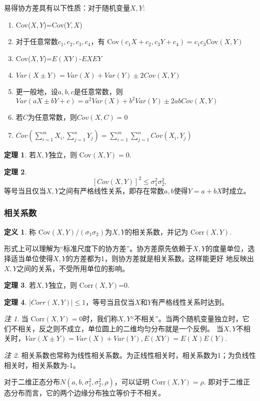 \documentclass[a4paper,11pt]{article}%
\theoremstyle{remark}
\newtheorem*{remark}{注}
\theoremstyle{remark}
\theoremstyle{definition}
\newtheorem{theorem}{定理}[section]
\theoremstyle{definition}
\newtheorem*{definition}{定义}
\theoremstyle{plain}
\newcommand*{\abs}[1]{\lvert #1 \rvert}
\begin{document}
易得协方差具有以下性质：对于随机变量$X,Y$:
\begin{enumerate}
    \item Cov($X,Y$)=Cov($Y,X$)
    \item 对于任意常数$c_1,c_2,c_3,c_4$，有 Cov$(c_1X+c_2,c_3Y+c_4)=c_1c_3$Cov$(X,Y)$
    \item Cov($X,Y$)=$E(XY)$-$EXEY$
    \item$Var(X\pm Y)=Var(X)+Var(Y)\pm 2Cov(X,Y)$
    \item 更一般地，设$a,b,c$是任意常数，则$Var(aX\pm bY+c)=a^2Var(X)+b^2Var(Y)\pm 2abCov(X,Y)$
    \item 若$C$为任意常数，则$Cov(X,C)=0$
    \item$Cov(\sum_{i=1}^{m}X_i,\sum_{j=1}^{n}Y_j)=\sum_{i=1}^{m}\sum_{j=1}^{n}Cov(X_i,Y_j)$
\end{enumerate}
\begin{theorem}
    若$X,Y$独立，则 Cov$(X,Y)=0$.
\end{theorem}
\begin{theorem}
    \[[Cov(X,Y)]^2\leq\sigma_1^2\sigma_2^2,\]
    等号当且仅当$X,Y$之间有严格线性关系，即存在常数$a,b$使得$Y=a+bX$时成立。
\end{theorem}
\subsubsection{相关系数}
\begin{definition}
    称 Cov$(X,Y)/(\sigma_1\sigma_2)$为$X,Y$的相关系数，并记为 Corr$(X,Y)$.
\end{definition}
形式上可以理解为“标准尺度下的协方差”。协方差原先依赖于$X,Y$的度量单位，选择适当单位使得$X,Y$的方差都为1，则协方差就是相关系数。这样能更好
地反映出$X,Y$之间的关系，不受所用单位的影响。
\begin{theorem}
    若$X,Y$独立，则 Corr$(X,Y)$=0.
\end{theorem}
\begin{theorem}$\abs{Corr(X,Y)}\leq 1$，等号当且仅当$X$和$Y$有严格线性关系时达到。
\end{theorem}
\begin{remark}
    当 Corr$(X,Y)=0$时，我们称$X,Y$“不相关”。当两个随机变量独立时，它们不相关，反之则不成立，单位圆上的二维均匀分布就是一个反例。
    当$X,Y$不相关时，$Var(X\pm Y)=Var(X)+Var(Y),E(XY)=E(X)E(Y).$
\end{remark}
\begin{remark}
    相关系数也常称为线性相关系数。为正线性相关时，相关系数为1；为负线性相关时，相关系数为-1。
\end{remark}
对于二维正态分布$N(a,b,\sigma_1^2,\sigma_2^2,\rho)$，可以证明 Corr$(X,Y)=\rho$. 即对于二维正态分布而言，它的两个边缘分布独立等价于不相关。
\end{document}
